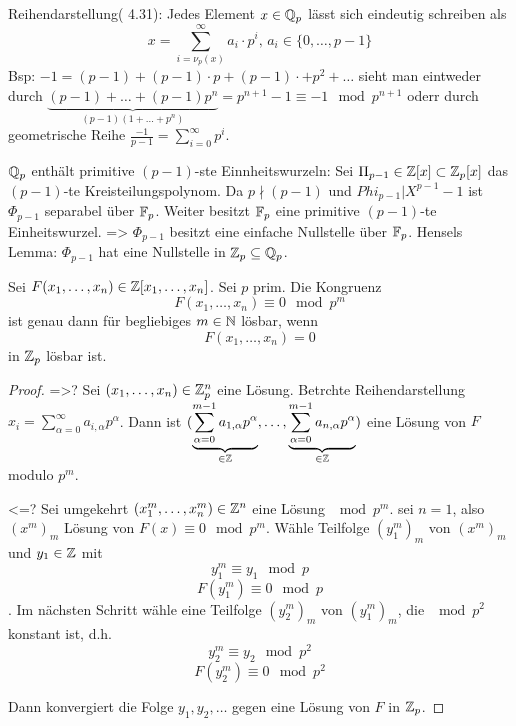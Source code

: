 \documentclass[../main.tex]{subfiles}
\begin{document}
\begin{remark}
    Reihendarstellung( 4.31):
    Jedes Element $x\in \mathbb{Q}_p$ lässt sich eindeutig schreiben als $$x=\sum_{i=\nu_p(x)}^\infty a_i\cdot p^i\text{, } a_i\in \{0,\dots,p-1\}$$
    Bsp: $-1 = (p-1) + (p-1) \cdot p + (p-1)\cdot +p^2+\dots$
    sieht man eintweder durch $\underbrace{(p-1)+\dots + (p-1) p^n}_{(p-1)(1+\dots+p^n)} = p^{n+1}-1\equiv -1\mod p^{n+1}$ oderr durch geometrische Reihe $\frac{-1}{p-1}=\sum_{i=0}^\infty p^i$.

    $\mathbb{Q}_p$ enthält primitive $(p-1)$-ste Einnheitswurzeln:
    Sei $\Pi_{p-1}\in \mathbb{Z}[x]\subset \mathbb{Z}_p[x]$ das $(p-1)$-te Kreisteilungspolynom.
    Da $p\nmid (p-1)$ und $Phi_{p-1}|X^{p-1}-1$ ist $\Phi_{p-1}$ separabel über $\mathbb{F}_p$.
    Weiter besitzt $\mathbb{F}_p$ eine primitive $(p-1)$-te Einheitswurzel.
    => $\Phi_{p-1}$ besitzt eine einfache Nullstelle über $\mathbb{F}_p$.
    Hensels Lemma: $\Phi_{p-1}$ hat eine Nullstelle in $\mathbb{Z}_p\subseteq \mathbb{Q}_p$.
\end{remark}

\begin{theorem} %
    Sei $F(x_1,\dots, x_n)\in \mathbb{Z}[x_1,\dots,x_n]$.
    Sei $p$ prim. Die Kongruenz $$F(x_1,\dots,x_n) \equiv 0\mod p^m$$
    ist genau dann für begliebiges $m \in \mathbb{N}$ lösbar, wenn $$F(x_1,\dots,x_n)=0$$ in $\mathbb{Z}_p$ lösbar ist.
\end{theorem}
\begin{proof}
    =>?
    Sei $(x_1,\dots,x_n)\in \mathbb{Z}_p^n$ eine Lösung. 
    Betrchte Reihendarstellung $x_i=\sum_{\alpha=0}^\infty a_{i,\alpha} p^\alpha$.
    Dann ist $(\underbrace{\sum_{\alpha =0}^{m-1} a_{1,\alpha} p^\alpha}_{\in\mathbb{Z}}, \dots,\underbrace{\sum_{\alpha = 0}^{m-1} a_{n,\alpha}p^\alpha}_{\in\mathbb{Z}})$
    eine Lösung von $F$ modulo $p^m$.

    <=?
    Sei umgekehrt $(x_1^m, \dots, x_n^m) \in \mathbb{Z}^n$ eine Lösung $\mod p^m$.
    \obda sei $n=1$, also $(x^m)_m$ Lösung von $F(x) \equiv 0\mod p^m$.
    Wähle Teilfolge $(y_1^m)_m$ von $(x^m)_m$ und $y_1\in \mathbb{Z}$ mit $$y_1^m \equiv y_1\mod p$$
    $$F(y_1^m)\equiv 0 \mod p$$.
    Im nächsten Schritt wähle eine Teilfolge $(y_2^m)_m$ von $(y_1^m)_m$, die $\mod p^2$ konstant ist, d.h. $$y_2^m\equiv y_2\mod p^2$$
    $$F(y_2^m) \equiv 0\mod p^2$$

    Dann konvergiert die Folge $y_1,y_2,\dots$ gegen eine Lösung von $F$ in $\mathbb{Z}_p$.
\end{proof}
\end{document}
